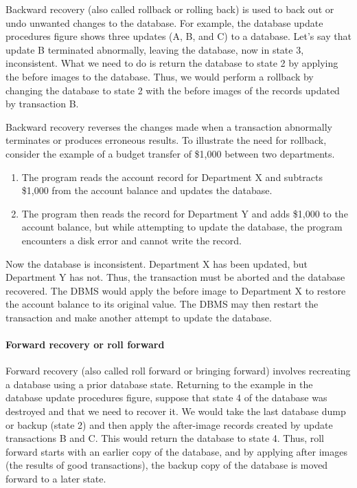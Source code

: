 \documentclass[
]{article}
\begin{document}
Backward recovery (also called rollback or rolling back) is used to back
out or undo unwanted changes to the database. For example, the database
update procedures figure shows three updates (A, B, and C) to a
database. Let's say that update B terminated abnormally, leaving the
database, now in state 3, inconsistent. What we need to do is return the
database to state 2 by applying the before images to the database. Thus,
we would perform a rollback by changing the database to state 2 with the
before images of the records updated by transaction B.

Backward recovery reverses the changes made when a transaction
abnormally terminates or produces erroneous results. To illustrate the
need for rollback, consider the example of a budget transfer of \$1,000
between two departments.

\begin{enumerate}
\def\labelenumi{\arabic{enumi}.}
\item
  The program reads the account record for Department X and subtracts
  \$1,000 from the account balance and updates the database.
\item
  The program then reads the record for Department Y and adds \$1,000
  to the account balance, but while attempting to update the database,
  the program encounters a disk error and cannot write the record.
\end{enumerate}

Now the database is inconsistent. Department X has been updated, but
Department Y has not. Thus, the transaction must be aborted and the
database recovered. The DBMS would apply the before image to Department
X to restore the account balance to its original value. The DBMS may
then restart the transaction and make another attempt to update the
database.

\hypertarget{forward-recovery-or-roll-forward}{%
\paragraph*{Forward recovery or roll forward}\label{forward-recovery-or-roll-forward}}

Forward recovery (also called roll forward or bringing forward) involves
recreating a database using a prior database state. Returning to the
example in the database update procedures figure, suppose that state 4
of the database was destroyed and that we need to recover it. We would
take the last database dump or backup (state 2) and then apply the
after-image records created by update transactions B and C. This would
return the database to state 4. Thus, roll forward starts with an
earlier copy of the database, and by applying after images (the results
of good transactions), the backup copy of the database is moved forward
to a later state.
\end{document}
